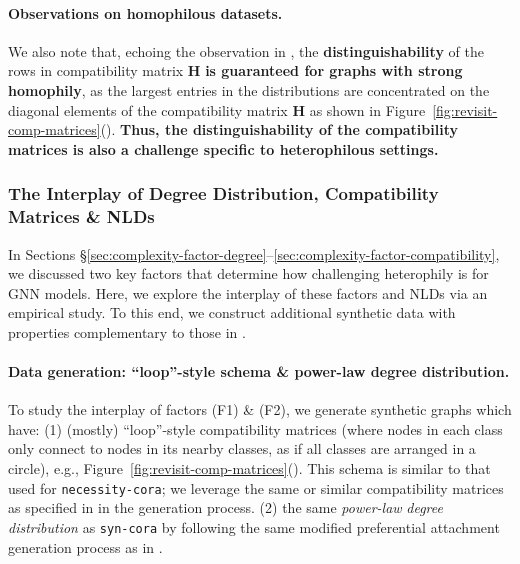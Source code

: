 \paragraph{Observations on homophilous datasets.} We also note that, echoing the observation in \cite{ma2021homophily}, the \textbf{distinguishability} of the rows in compatibility matrix $\mathbf{H}$ \textbf{is guaranteed for graphs with strong homophily}, as the largest entries in the distributions are concentrated on the diagonal elements of the compatibility matrix $\mathbf{H}$ as shown in Figure~\ref{fig:revisit-comp-matrices}(). 
\textbf{Thus, the distinguishability of the compatibility matrices is also a challenge specific to heterophilous settings.}

\subsubsection{The Interplay of Degree Distribution, Compatibility Matrices \& NLDs}
\label{sec:complexity-experiments}

In Sections \S\ref{sec:complexity-factor-degree}--\ref{sec:complexity-factor-compatibility}, we discussed two key factors that determine how challenging heterophily is for GNN models. 
Here, we explore the interplay of these factors and NLDs via an empirical study. 
To this end, we construct additional synthetic data with properties complementary to those in \cite{zhu2020beyond,ma2021homophily}. 



\paragraph{Data generation: ``loop''-style schema \& power-law degree distribution.} 
To study the interplay of factors (F1) \& (F2), we generate synthetic graphs which have:
(1) (mostly) %
``loop''-style compatibility matrices (where nodes in each class only connect to nodes in its nearby classes, as if all classes are arranged in a circle), e.g., Figure~\ref{fig:revisit-comp-matrices}().
This schema is similar to that used for \texttt{necessity-cora};
we leverage the same or similar compatibility matrices as specified in \cite{ma2021homophily} in the generation process. (2) the same \emph{power-law} \emph{degree distribution} as \texttt{syn-cora} by following the same modified preferential attachment generation process as in \cite{zhu2020beyond,zhu2021graph}. 

